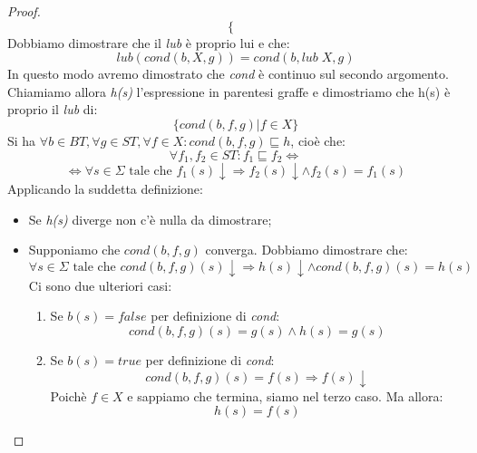 \documentclass[a4paper, 10pt]{article} %
\begin{document}
\begin{proof}
$$\begin{cases}
  \end{cases} $$
  Dobbiamo dimostrare che il \emph{lub} è proprio lui e che:
  $$ lub(cond(b,X,g)) = cond(b, lub\; X, g) $$
  In questo modo avremo dimostrato che \emph{cond} è continuo sul secondo argomento. Chiamiamo allora \emph{h(s)} l'espressione in parentesi graffe e dimostriamo che h(s) è proprio il \emph{lub} di:
  $$ \{cond(b,f,g) | f \in X \} $$
  Si ha $ \forall b \in BT, \forall g \in ST, \forall f \in X : cond(b,f,g) \sqsubseteq h $, cioè che:
  $$ \forall f_1, f_2 \in ST : f_1 \sqsubseteq f_2 \Leftrightarrow $$
  $$ \Leftrightarrow \forall s \in \Sigma \mbox{ tale che } f_{1}(s) \downarrow \Rightarrow f_{2}(s) \downarrow \land f_{2}(s) = f_{1}(s) $$
  Applicando la suddetta definizione:
  \begin{itemize}
  \item Se \emph{h(s)} diverge non c'è nulla da dimostrare;
  \item Supponiamo che $cond(b,f,g)$ converga. Dobbiamo dimostrare che:
    $$ \forall s \in \Sigma \mbox{ tale che } cond(b,f,g)(s) \downarrow \Rightarrow h(s) \downarrow \land cond(b,f,g)(s) = h(s) $$
    Ci sono due ulteriori casi:
    \begin{enumerate}
    \item Se $b(s) = false$ per definizione di \emph{cond}:
      $$ cond(b,f,g)(s) = g(s) \land h(s) = g(s) $$
    \item Se $b(s)=true$ per definizione di \emph{cond}:
      $$ cond(b,f,g)(s) = f(s) \Rightarrow f(s) \downarrow $$
      Poichè $f \in X$ e sappiamo che termina, siamo nel terzo caso. Ma allora:
      $$ h(s) = f(s) $$
    \end{enumerate}	
  \end{itemize}


\end{proof}
\end{document}
